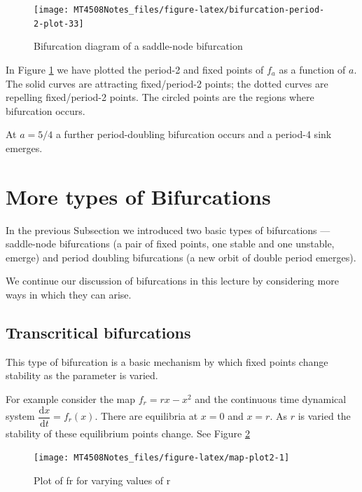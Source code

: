 \documentclass[
  a4paper,
  oneside,
  final]{krantz}
\renewcommand{\d}{\mathrm{d}}
\newcommand{\der}[2]{\dfrac{\d #1}{\d #2}}
\theoremstyle{definition}
\theoremstyle{definition}
\theoremstyle{definition}
\theoremstyle{definition}
\theoremstyle{remark}
\begin{document}
\begin{figure}

{\centering \texttt{[image: MT4508Notes\_files/figure-latex/bifurcation-period-2-plot-33]} 

}

\caption{Bifurcation diagram of a saddle-node bifurcation}\label{fig:bifurcation-period-2-plot}
\end{figure}

In Figure \ref{fig:bifurcation-period-2-plot} we have plotted the
period-2 and fixed points of \(f_a\) as a function of \(a\). The solid
curves are attracting fixed/period-2 points; the dotted curves are
repelling fixed/period-2 points. The circled points are the regions
where bifurcation occurs.

At \(a = 5/4\) a further period-doubling bifurcation occurs and a period-4
sink emerges.

\hypertarget{more-birfurcations}{%
\section{More types of Bifurcations}\label{more-birfurcations}}

In the previous Subsection we introduced two basic types of bifurcations
--- saddle-node bifurcations (a pair of fixed points, one stable and one
unstable, emerge) and period doubling bifurcations (a new orbit of
double period emerges).

We continue our discussion of bifurcations in this lecture by
considering more ways in which they can arise.

\hypertarget{trans-bifurcations}{%
\subsection*{Transcritical bifurcations}\label{trans-bifurcations}}


This type of bifurcation is a basic mechanism by which fixed points
change stability as the parameter is varied.

For example consider the map \(f_{r} = rx - x^2\) and the continuous time
dynamical system \(\der{x}{t} = f_{r}(x)\). There are equilibria at \(x =0\)
and \(x =r\). As \(r\) is varied the stability of these equilibrium points
change. See Figure \ref{fig:map-plot2}

\begin{figure}

{\centering \texttt{[image: MT4508Notes\_files/figure-latex/map-plot2-1]} 

}

\caption{Plot of fr for varying values of r}\label{fig:map-plot2}
\end{figure}
\end{document}
